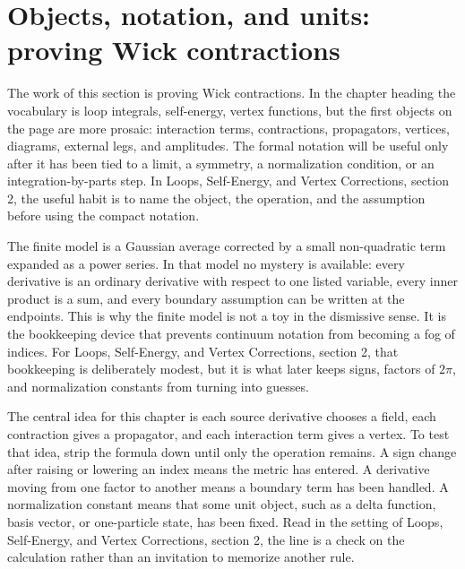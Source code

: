 \section{Objects, notation, and units: proving Wick contractions}













The work of this section is proving Wick contractions.  In the chapter heading the vocabulary is loop integrals, self-energy, vertex functions, but the first objects on the page are more prosaic: interaction terms, contractions, propagators, vertices, diagrams, external legs, and amplitudes.  The formal notation will be useful only after it has been tied to a limit, a symmetry, a normalization condition, or an integration-by-parts step.  In Loops, Self-Energy, and Vertex Corrections, section 2, the useful habit is to name the object, the operation, and the assumption before using the compact notation.

The finite model is a Gaussian average corrected by a small non-quadratic term expanded as a power series.  In that model no mystery is available: every derivative is an ordinary derivative with respect to one listed variable, every inner product is a sum, and every boundary assumption can be written at the endpoints.  This is why the finite model is not a toy in the dismissive sense.  It is the bookkeeping device that prevents continuum notation from becoming a fog of indices.  For Loops, Self-Energy, and Vertex Corrections, section 2, that bookkeeping is deliberately modest, but it is what later keeps signs, factors of \(2\pi\), and normalization constants from turning into guesses.

The central idea for this chapter is each source derivative chooses a field, each contraction gives a propagator, and each interaction term gives a vertex.  To test that idea, strip the formula down until only the operation remains.  A sign change after raising or lowering an index means the metric has entered.  A derivative moving from one factor to another means a boundary term has been handled.  A normalization constant means that some unit object, such as a delta function, basis vector, or one-particle state, has been fixed.  Read in the setting of Loops, Self-Energy, and Vertex Corrections, section 2, the line is a check on the calculation rather than an invitation to memorize another rule.

